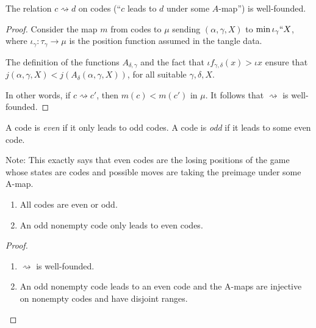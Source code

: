 \begin{lemma}
\label{lem:a-map-wf}
\leanok
The relation $c \rightsquigarrow d$ on codes (“$c$ leads to $d$ under some $A$-map”) is well-founded.
\end{lemma}

\begin{proof}
\leanok
  Consider the map $m$ from codes to $\mu$ sending $(\alpha,\gamma,X)$ to $\min \iota_\gamma``X$, where $\iota_\gamma : \tau_\gamma \to \mu$ is the position function assumed in the tangle data.

  The definition of the functions $A_{\delta,\gamma}$ and the fact that $\iota f_{\gamma,\delta}(x) > \iota x $ ensure that $j(\alpha,\gamma,X) < j(A_\delta(\alpha,\gamma,X))$, for all suitable $\gamma,\delta,X$.

  In other words, if $c \rightsquigarrow c'$, then $m(c) < m(c')$ in $\mu$.  It follows that $\rightsquigarrow$ is well-founded.
\end{proof}

\begin{definition}
\label {def:code-parity}
\leanok
A code is \emph{even} if it only leads to odd codes. A code is \emph{odd} if it leads to some even code.

Note: This exactly says that even codes are the losing positions of the game whose states are codes
and possible moves are taking the preimage under some A-map.
\end{definition}

\begin{lemma}
\label {lem:code-parity-properties}
\leanok
\begin{enumerate}
\item All codes are even or odd.
\item An odd nonempty code only leads to even codes.
\end{enumerate}
\end{lemma}
\begin{proof}
\leanok
\begin{enumerate}
\item $\rightsquigarrow$ is well-founded.
\item An odd nonempty code leads to an even code and the A-maps are injective on nonempty codes and have disjoint ranges.
\end{enumerate}
\end{proof}

